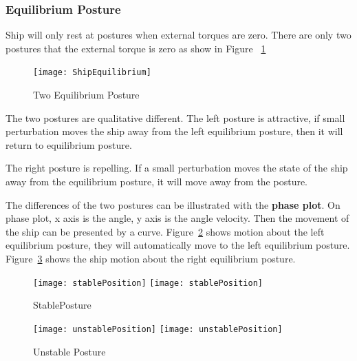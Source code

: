 \subsubsection*{Equilibrium Posture}
Ship will only rest at postures when external torques are zero.
There are only two postures that the external torque is zero as show in Figure ~\ref{fig:ShipEqulibrium}
\begin{figure}[!htbp]
  \begin{center}
    \leavevmode
      \texttt{[image: ShipEquilibrium]}
    \caption{Two Equilibrium Posture}
    \label{fig:ShipEqulibrium}
  \end{center}
\end{figure}



The two postures are qualitative different.
The left posture is attractive, if small perturbation moves the ship away from the left equilibrium posture, then it will return to equilibrium posture.

The right posture is repelling.
If a small perturbation moves the state of the ship away from the equilibrium posture, it will move away from the posture.

The differences of the two postures can be illustrated with the \textbf{phase plot}.
On phase plot, x axis is the angle, y axis is the angle velocity. 
Then the movement of the ship can be presented by a curve.
Figure~\ref{fig:StablePosture}  shows motion about the left equilibrium posture, they will automatically move to the left equilibrium posture.
Figure~\ref{fig:unStablePosture} shows the ship motion about the right equilibrium posture.
 
\begin{figure}[!htbp]
  \begin{center}
    \leavevmode
    \ifpdf
      \texttt{[image: stablePosition]}
    \else
      \texttt{[image: stablePosition]}
    \fi
    \caption{StablePosture}
    \label{fig:StablePosture}
  \end{center}
\end{figure}


\begin{figure}[!htbp]
  \begin{center}
    \leavevmode
    \ifpdf
      \texttt{[image: unstablePosition]}
    \else
      \texttt{[image: unstablePosition]}
    \fi
    \caption{Unstable Posture}
    \label{fig:unStablePosture}
  \end{center}
\end{figure}


